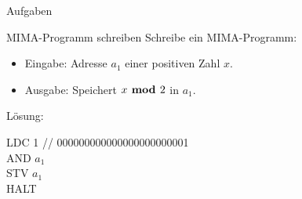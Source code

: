 \begin{frame}{Aufgaben}
	\begin{taskblock}{MIMA-Programm schreiben}
		Schreibe ein MIMA-Programm:
		\begin{itemize}
			\item Eingabe: Adresse $a_1$ einer positiven Zahl $x$.
			\item Ausgabe: Speichert $x \textbf{ mod } 2$ in $a_1$.
		\end{itemize}
	\end{taskblock}

	\bp \vspace{.5cm} Lösung:
	
	LDC 1 \quad // 000000000000000000000001 \\ AND $a_1$ \\ STV $a_1$ \\ HALT
\end{frame}

